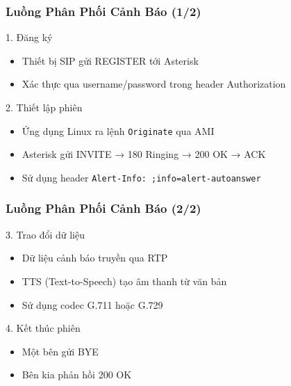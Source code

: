 \begin{frame}
\frametitle{Luồng Phân Phối Cảnh Báo (1/2)}

\begin{block}{1. Đăng ký}
\begin{itemize}
\item Thiết bị SIP gửi REGISTER tới Asterisk
\item Xác thực qua username/password trong header Authorization
\end{itemize}
\end{block}

\begin{block}{2. Thiết lập phiên}
\begin{itemize}
\item Ứng dụng Linux ra lệnh \texttt{Originate} qua AMI
\item Asterisk gửi INVITE → 180 Ringing → 200 OK → ACK
\item Sử dụng header \texttt{Alert-Info: ;info=alert-autoanswer}
\end{itemize}
\end{block}

\end{frame}

\begin{frame}
\frametitle{Luồng Phân Phối Cảnh Báo (2/2)}

\begin{block}{3. Trao đổi dữ liệu}
\begin{itemize}
\item Dữ liệu cảnh báo truyền qua RTP
\item TTS (Text-to-Speech) tạo âm thanh từ văn bản
\item Sử dụng codec G.711 hoặc G.729
\end{itemize}
\end{block}

\begin{block}{4. Kết thúc phiên}
\begin{itemize}
\item Một bên gửi BYE
\item Bên kia phản hồi 200 OK
\end{itemize}
\end{block}

\end{frame}


